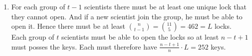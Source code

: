 \documentclass[a4paper,10pt]{extarticle}
\begin{document}
\begin{enumerate}
\begin{enumerate}
    \end{enumerate}
  \item
    For each group of $t-1$ scientists there must be at least one unique lock that they cannot open. And if a new scientist join the group, he must be able to open it. Hence there must be at least $\binom{n}{t-1}=\binom{11}{5}=462=L$ locks.\\
    Each group of $t$ scientists must be able to open the locks so at least $n-t+1$ must posses the keys. Each must therefore have $\frac{n-t+1}{n}\cdot L=252$ keys.
\end{enumerate}
\end{document}
